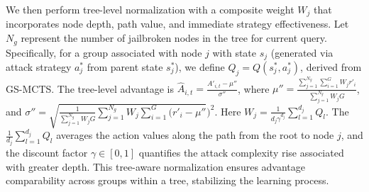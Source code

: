 \documentclass[11pt]{article}
\def\attackmethod{GS-MCTS}
\begin{document}
We then perform tree-level normalization with a composite weight $W_j$ that incorporates node depth, path value, and immediate strategy effectiveness. Let $N_g$ represent the number of jailbroken nodes in the tree for current query. Specifically, for a group associated with node $j$ with state $s_j$ (generated via attack strategy $a^*_j$ from parent state $s^*_j$), we define $Q_j = Q(s^*_j, a^*_j)$, derived from {\attackmethod}. The tree-level advantage is $\hat{A}_{i,t} = \frac{A'_{i,t} - \mu''}{\sigma''}$, where
$\mu'' = \frac{\sum_{j = 1}^{N_{g}} \sum_{i=1}^{G} W_jr'_i}{\sum_{j=1}^{N_{g}} W_j G}$, and 
$\sigma'' = \sqrt{\frac{1}{\sum_{j = 1}^{N_{g}} W_j G} \sum_{j=1}^{N_{g}} W_j \sum_{i=1}^{G} \Big(r'_i - \mu''}\Big)^2.$
Here $W_j = \frac{1}{d_j\gamma^{d_j}} \sum_{l=1}^{d_j} Q_l$. The $\frac{1}{d_j} \sum_{l=1}^{d_j} Q_l$ averages the action values along the path from the root to node $j$, and the discount factor $\gamma \in [0,1]$ quantifies the attack complexity rise associated with greater depth. This tree-aware normalization ensures advantage comparability across groups within a tree, stabilizing the learning process.










\end{document}
